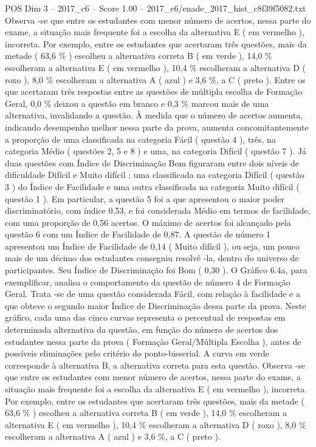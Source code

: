 \begin{textsample}{POS Dim 3 – 2017\_c6 – Score 1.00 – 2017\_c6/enade\_2017\_hist\_c8f39f5082.txt}
Observa -se que entre os estudantes com menor número de acertos, nessa parte do exame, a situação mais frequente foi a escolha da alternativa E ( em vermelho ), incorreta.
Por exemplo, entre os estudantes que acertaram três questões, mais da metade ( 63,6 \% ) escolheu a alternativa correta B ( em verde ), 14,0 \% escolheram a alternativa E ( em vermelho ), 10,4 \% escolheram a alternativa D ( roxo ), 8,0 \% escolheram a alternativa A ( azul ) e 3,6 \%, a C ( preto ).
Entre os que acertaram três respostas entre as questões de múltipla escolha de Formação Geral, 0,0 \% deixou a questão em branco e 0,3 \% marcou mais de uma alternativa, invalidando a questão.
À medida que o número de acertos aumenta, indicando desempenho melhor nessa parte da prova, aumenta concomitantemente a proporção de uma classificada na categoria Fácil ( questão 4 ), três, na categoria Médio ( questões 2, 5 e 8 ) e uma, na categoria Difícil ( questão 7 ).
Já duas questões com Índice de Discriminação Bom figuraram entre dois níveis de dificuldade Difícil e Muito difícil : uma classificada na categoria Difícil ( questão 3 ) do Índice de Facilidade e uma outra classificada na categoria Muito difícil ( questão 1 ).
Em particular, a questão 5 foi a que apresentou o maior poder discriminatório, com índice 0,53, e foi considerada Médio em termos de facilidade, com uma proporção de 0,56 acertos.
O máximo de acertos foi alcançado pela questão 6 com um Índice de Facilidade de 0,87.
A questão de número 1 apresentou um Índice de Facilidade de 0,14 ( Muito difícil ), ou seja, um pouco mais de um décimo dos estudantes conseguiu resolvê -la, dentro do universo de participantes.
Seu Índice de Discriminação foi Bom ( 0,30 ).
O Gráfico 6.4a, para exemplificar, analisa o comportamento da questão de número 4 de Formação Geral.
Trata -se de uma questão considerada Fácil, com relação à facilidade e a que obteve o segundo maior Índice de Discriminação dessa parte da prova.
Neste gráfico, cada uma das cinco curvas representa o percentual de respostas em determinada alternativa da questão, em função do número de acertos dos estudantes nessa parte da prova ( Formação Geral/Múltipla Escolha ), antes de possíveis eliminações pelo critério do ponto-bisserial.
A curva em verde corresponde à alternativa B, a alternativa correta para esta questão.
Observa -se que entre os estudantes com menor número de acertos, nessa parte do exame, a situação mais frequente foi a escolha da alternativa E ( em vermelho ), incorreta.
Por exemplo, entre os estudantes que acertaram três questões, mais da metade ( 63,6 \% ) escolheu a alternativa correta B ( em verde ), 14,0 \% escolheram a alternativa E ( em vermelho ), 10,4 \% escolheram a alternativa D ( roxo ), 8,0 \% escolheram a alternativa A ( azul ) e 3,6 \%, a C ( preto ).

\end{textsample}
